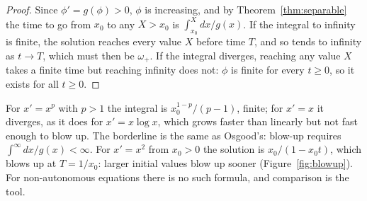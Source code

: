\documentclass[11pt,a4paper]{article}
\numberwithin{equation}{section}
\theoremstyle{definition}
\begin{document}
\begin{proof}
Since $\phi' = g(\phi) > 0$, $\phi$ is increasing, and by Theorem~\ref{thm:separable} the time to go from $x_0$ to any $X > x_0$ is $\int_{x_0}^Xdx/g(x)$. If the integral to infinity is finite, the solution
reaches every value $X$ before time $T$, and so tends to infinity as $t \to T$, which must then be $\omega_+$. If the integral diverges, reaching any value $X$ takes a finite time but
reaching infinity does not: $\phi$ is finite for every $t \geq 0$, so it exists for all $t \geq 0$.
\end{proof}

For $x' = x^p$ with $p > 1$ the integral is $x_0^{1-p}/(p - 1)$, finite; for $x' = x$ it diverges, as it does for $x' = x\log x$, which grows faster than linearly but not fast enough to
blow up. The borderline is the same as Osgood's: blow-up requires $\int^\infty dx/g(x) < \infty$. For $x' = x^2$ from $x_0 > 0$ the solution is $x_0/(1 - x_0t)$, which blows up at $T = 1/x_0$: larger
initial values blow up sooner (Figure~\ref{fig:blowup}). For non-autonomous equations there is no such formula, and comparison is the tool.
\end{document}
